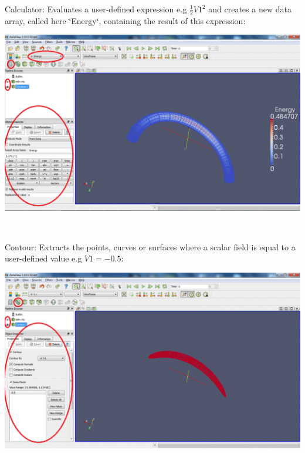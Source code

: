\begin{DoxyEnumerate}
\item {\ttfamily Calculator\+:} Evaluates a user-\/defined expression e.\+g $ \frac{1}{2} V1^2 $ and creates a new data array, called here \char`\"{}\+Energy\char`\"{}, containing the result of this expression\+: ~\newline
 
\begin{DoxyImageNoCaption}
  \mbox{\includegraphics[width=\textwidth]{paraview07}}
\end{DoxyImageNoCaption}
 ~\newline

\item {\ttfamily Contour\+:} Extracts the points, curves or surfaces where a scalar field is equal to a user-\/defined value e.\+g $ V1 = -0.5 $\+: ~\newline
 
\begin{DoxyImageNoCaption}
  \mbox{\includegraphics[width=\textwidth]{paraview08}}
\end{DoxyImageNoCaption}
 ~\newline


\end{DoxyEnumerate}
